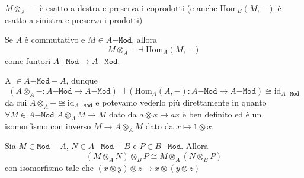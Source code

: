\begin{corollary}{}
    \(M \otimes_A -\) è esatto a destra e preserva i coprodotti (e anche
    \(\mathrm{Hom}_B{(M, -)}\) è esatto a sinistra e preserva i prodotti)
\end{corollary}
\begin{corollary}{}\label{cor:mod_tens}
    Se \(A\) è commutativo e \(M \in A\mathtt{-Mod}\), allora
    \[
        M \otimes_A - \dashv \mathrm{Hom}_A{(M, -)}
    \]
    come funtori \(A\mathtt{-Mod} \to A\mathtt{-Mod}\).
\end{corollary}

\begin{remark}{}
    A \(\in A\mathtt{-Mod-}A\), dunque 
    \[
      {(A \otimes_A - : A\mathtt{-Mod} \to A\mathtt{-Mod})} \dashv
      {(\mathrm{Hom}_A{(A,-)}: A\mathtt{-Mod} \to A\mathtt{-Mod})} \cong
      \mathrm{id}_{A\mathtt{-Mod}} 
    \]
    da cui \(A \otimes_A - \cong \mathrm{id}_{A\mathtt{-Mod}}\) e potevamo
    vederlo più direttamente in quanto \(\forall M \in A\mathtt{-Mod}\) \(A
    \otimes_A M \to M\) dato da \(a \otimes x \mapsto ax\) è ben definito ed è
    un isomorfismo con inverso \(M \to A \otimes_A M\) dato da \(x \mapsto 1
    \otimes x\).
\end{remark}

\begin{proposition}{}
    Sia \(M \in \mathtt{Mod-}A\), \(N \in A\mathtt{-Mod-}B\) e \(P \in
    B\mathtt{-Mod}\). Allora 
    \[
      {(M \otimes_A N)}\otimes_B P \cong M \otimes_A {(N \otimes_B P)}
    \]
    con isomorfismo tale che \({(x \otimes y)} \otimes z \mapsto x \otimes {(y
    \otimes z)}\) 
\end{proposition}

